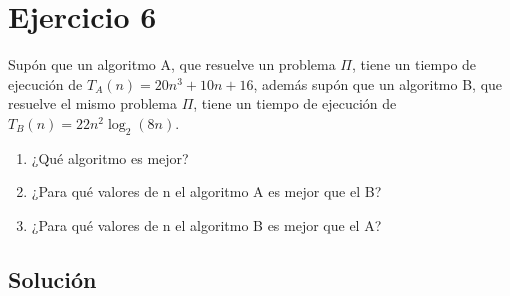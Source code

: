 \section{Ejercicio 6}


\begin{tcolorbox}[enunciado]
Supón que un algoritmo A, que resuelve un problema $\Pi$, tiene un tiempo de ejecución de $T_{A}(n)=20n^{3}+10n+16$, además supón que un algoritmo B, que resuelve el mismo problema $\Pi$, tiene un tiempo de ejecución de $T_{B}(n)=22n^{2}\log_{2}(8n)$.
\begin{enumerate}
    \item ¿Qué algoritmo es mejor?
    \item ¿Para qué valores de n el algoritmo A es mejor que el B?
    \item ¿Para qué valores de n el algoritmo B es mejor que el A?
\end{enumerate}
\end{tcolorbox}

\subsection{Solución}

